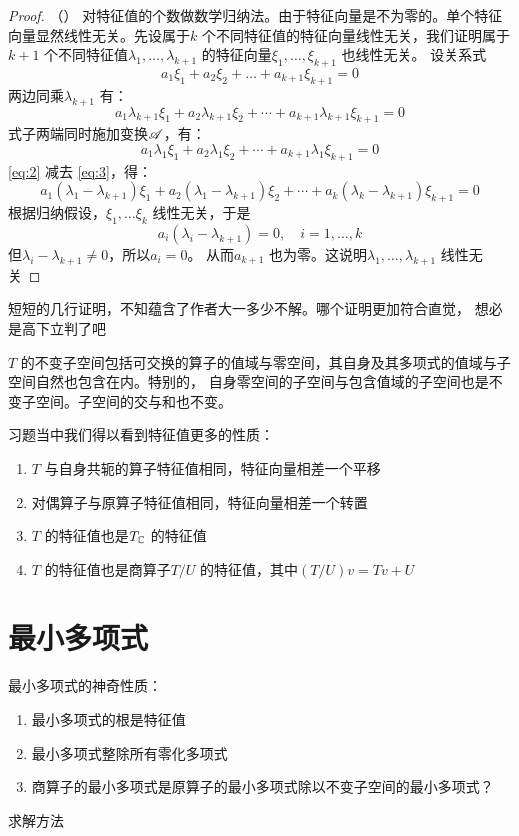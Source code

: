 \begin{proof}
    （\cite[p.~204 定理~8]{GaoDengDaiShu2019}）
    对特征值的个数做数学归纳法。由于特征向量是不为零的。单个特征向量显然线性无关。先设属于\(k\)
    个不同特征值的特征向量线性无关，我们证明属于\(k+1\) 个不同特征值\(\lambda_1,\dots
    ,\lambda_{k+1}\) 的特征向量\(\xi_1,\dots, \xi_{k+1}\) 也线性无关。
    设关系式
    \begin{equation}
        a_1\xi_1 + a_2\xi_2 + \dots + a_{k+1}\xi_{k+1} = 0 \label{1}
    \end{equation}
    两边同乘\(\lambda_{k+1}\) 有：
    \begin{equation}
        a_1\lambda_{k+1}\xi_1 + a_2\lambda_{k+1}\xi_2 +
        \cdots + a_{k+1}\lambda_{k+1}\xi_{k+1} = 0 \label{eq:2}
    \end{equation}
    式子两端同时施加变换\(\mathscr{A}\)，有：
    \begin{equation}
        a_1\lambda_1\xi_1 + a_2\lambda_1\xi_2 + \cdots +
        a_{k+1}\lambda_1\xi_{k+1} = 0 \label{eq:3}
    \end{equation}
    \cref{eq:2} 减去 \cref{eq:3}，得：
    \[
        a_1(\lambda_1 - \lambda_{k+1})\xi_1 + a_2(\lambda_1
        - \lambda_{k+1})\xi_2 + \cdots +
        a_{k}(\lambda_{k} - \lambda_{k+1})\xi_{k+1} = 0
    \]
    根据归纳假设，\(\xi_1,\dots \xi_{k}\) 线性无关，于是
    \[
        a_{i}(\lambda_{i} - \lambda_{k+1}) = 0, \quad i=1,\dots ,k
    \]
    但\(\lambda_{i}-\lambda_{k+1}\neq 0\)，所以\(a_{i}=0\)。
    从而\(a_{k+1}\) 也为零。这说明\(\lambda_1,\dots ,\lambda_{k+1}\) 线性无关
\end{proof}

短短的几行证明，不知蕴含了作者大一多少不解。哪个证明更加符合直觉，
想必是高下立判了吧

\(T\) 的不变子空间包括可交换的算子的值域与零空间，其自身及其多项式的值域与子空间自然也包含在内。特别的，
自身零空间的子空间与包含值域的子空间也是不变子空间。子空间的交与和也不变。

习题当中我们得以看到特征值更多的性质：
\begin{enumerate}
    \item \(T\) 与自身共轭的算子特征值相同，特征向量相差一个平移
    \item 对偶算子与原算子特征值相同，特征向量相差一个转置
    \item \(T\) 的特征值也是\(T_{\mathbb{C}}\) 的特征值
    \item \(T\) 的特征值也是商算子\(T/U\) 的特征值，其中\((T/U)v=Tv+U\)
\end{enumerate}

\section{最小多项式}


最小多项式的神奇性质：
\begin{enumerate}
    \item 最小多项式的根是特征值
    \item 最小多项式整除所有零化多项式
    \item 商算子的最小多项式是原算子的最小多项式除以不变子空间的最小多项式？
\end{enumerate}
求解方法

